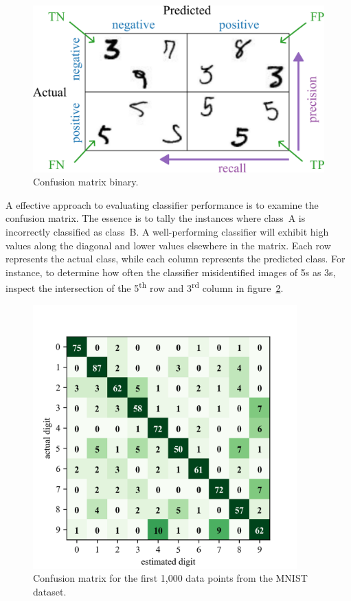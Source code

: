 \documentclass[12pt,letter]{article}
\begin{document}
\begin{figure}[H]
    \centering
    \includegraphics[]{../figures/confusion_matrix_binary.png}
    \caption{Confusion matrix binary.}
    \label{fig:confusion_matrix_binary}
\end{figure}


 A effective approach to evaluating classifier performance is to examine the confusion matrix. The essence is to tally the instances where class~A is incorrectly classified as class~B. A well-performing classifier will exhibit high values along the diagonal and lower values elsewhere in the matrix. Each row represents the actual class, while each column represents the predicted class. For instance, to determine how often the classifier misidentified images of 5s as 3s, inspect the intersection of the 5\textsuperscript{th} row and 3\textsuperscript{rd} column in figure~\ref{fig:confusion_matrix}.



\begin{figure}[H]
    \centering
    \includegraphics[width=4in]{../figures/digit_confusion_matrix_limited.png}
    \caption{Confusion matrix for the first 1,000 data points from the MNIST dataset.}
    \label{fig:confusion_matrix}
\end{figure}
\end{document}
